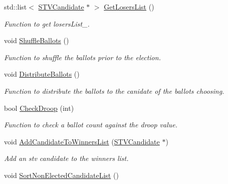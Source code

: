 \begin{DoxyCompactItemize}
\mbox{\label{classSTVElectionRecord_affc79a53b8fa74a8d7a65ae92b256387}} 
std\+::list$<$ \hyperlink{classSTVCandidate}{S\+T\+V\+Candidate} $\ast$ $>$ \hyperlink{classSTVElectionRecord_affc79a53b8fa74a8d7a65ae92b256387}{Get\+Losers\+List} ()
\begin{DoxyCompactList}\small\item\em Function to get losers\+List\+\_\+. \end{DoxyCompactList}\item 
\mbox{\label{classSTVElectionRecord_a9f0c214158ad1d590db5f0ac3712c4ef}} 
void \hyperlink{classSTVElectionRecord_a9f0c214158ad1d590db5f0ac3712c4ef}{Shuffle\+Ballots} ()
\begin{DoxyCompactList}\small\item\em Function to shuffle the ballots prior to the election. \end{DoxyCompactList}\item 
\mbox{\label{classSTVElectionRecord_a38efbeda31b39ea6973d3b77b2ef3769}} 
void \hyperlink{classSTVElectionRecord_a38efbeda31b39ea6973d3b77b2ef3769}{Distribute\+Ballots} ()
\begin{DoxyCompactList}\small\item\em Function to distribute the ballots to the canidate of the ballots choosing. \end{DoxyCompactList}\item 
bool \hyperlink{classSTVElectionRecord_ab941d3821a34ef527128042500c416c7}{Check\+Droop} (int)
\begin{DoxyCompactList}\small\item\em Function to check a ballot count against the droop value. \end{DoxyCompactList}\item 
void \hyperlink{classSTVElectionRecord_af466fd6edc790d7744fe809e7ee9d40c}{Add\+Candidate\+To\+Winners\+List} (\hyperlink{classSTVCandidate}{S\+T\+V\+Candidate} $\ast$)
\begin{DoxyCompactList}\small\item\em Add an stv candidate to the winners list. \end{DoxyCompactList}\item 
\mbox{\label{classSTVElectionRecord_a856aa1d361b69b646072579f098b0b3c}} 
void \hyperlink{classSTVElectionRecord_a856aa1d361b69b646072579f098b0b3c}{Sort\+Non\+Elected\+Candidate\+List} ()

\end{DoxyCompactItemize}
